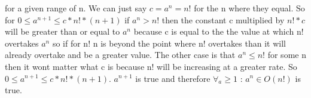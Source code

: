 \documentclass[11pt]{article}
\begin{document}
    for a given range of n. We can just say $ c = a^{n} = n! $ for the n where they equal. So for 
    $ 0 \leq a^{n + 1} \leq c * n! * (n + 1) $ if $ a^{n} > n! $ then the constant c multiplied by 
    $ n! * c $ will be greater than or equal to $ a^{n} $ because c is equal to the the value 
    at which n! overtakes $ a^{n} $ so if for n! n is beyond the point where n! overtakes than it will already
    overtake and be a greater value. The other case is that $ a^{n} \leq n! $ for some n then it wont matter what
    c is because n! will be increasing at a greater rate. So $ 0 \leq a^{n + 1} \leq c * n! * (n + 1) $. $ a^{n + 1} $
    is true and therefore $ \forall_{a} \geq 1 $ : $ a^{n} \in O(n!) $ is true.


    
\end{document}
